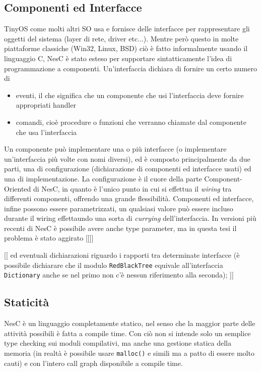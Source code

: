 \documentclass[pdftex,12pt,a4paper,italian,openany]{book}
\begin{document}
\subsection{Componenti ed Interfacce}
TinyOS come molti altri SO usa e fornisce delle interfacce per rappresentare gli oggetti del 
sistema (layer di rete, driver etc...). 
Mentre però questo in molte piattaforme classiche (Win32, Linux, BSD) ciò è fatto informalmente 
usando il linguaggio C, NesC è stato esteso per supportare sintatticamente l'idea di 
programmazione a componenti. 
Un'interfaccia dichiara di fornire un certo numero di 
\begin{itemize}

\item{eventi, il che significa che un componente che usi l'interfaccia deve fornire appropriati
handler} 

\item{comandi, cioè procedure o funzioni che verranno chiamate dal componente che usa l'interfaccia}
\end{itemize}

Un componente può implementare una o più interfacce (o implementare un'interfaccia più volte 
con nomi diversi), ed è composto principalmente da due parti, una di configurazione 
(dichiarazione di componenti ed interfacce usati) ed una di implementazione.
La configurazione è il cuore della parte Component-Oriented di NesC, in quanto è l'unico punto 
in cui si effettua il \emph{wiring} tra differenti componenti, offrendo una grande flessibilità.
Componenti ed interfacce, infine possono essere parametrizzati, un qualsiasi valore può essere 
incluso durante il wiring effettaundo una sorta di \emph{currying} dell'interfaccia. 
In versioni più recenti di NesC è possibile avere anche type parameter, ma in questa tesi  
il problema è stato aggirato [[]]


[[ ed eventuali dichiarazioni 
riguardo i rapporti tra determinate interfacce (è possibile dichiarare che il modulo 
\texttt{RedBlackTree} equivale all'interfaccia \texttt{Dictionary} anche se nel primo non 
c'è nessun  riferimento alla seconda);  ]]



\subsection{Staticità}

NesC è un linguaggio completamente statico, nel senso che la maggior parte delle attività 
possibili è fatta a compile time. Con ciò non si intende solo un semplice type checking sui 
moduli compilativi, ma anche una gestione statica della memoria (in realtà è possibile usare 
\texttt{malloc()} e simili ma a patto di essere molto cauti) e con l'intero call graph disponibile a compile time. 
\end{document}
